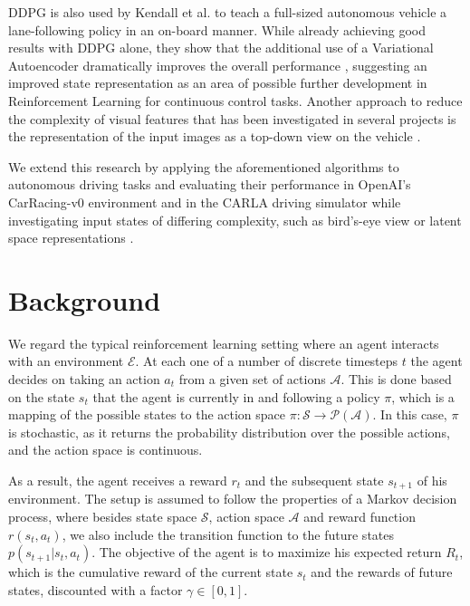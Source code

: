 \documentclass[letterpaper, 10 pt, conference]{ieeeconf}  %
\begin{document}
DDPG is also used by Kendall et al. to teach a full-sized autonomous vehicle a 
lane-following policy in an on-board manner. While already achieving good results 
with DDPG alone, they show that the additional use of a Variational Autoencoder dramatically 
improves the overall performance \cite{kendall2019learning}, suggesting an improved 
state representation as an area of possible further development in Reinforcement Learning 
for continuous control tasks. Another approach to reduce the complexity of visual 
features that has been investigated in several projects is the representation of the input 
images as a top-down view on the vehicle
 \cite{DBLP:journals/corr/abs-1812-03079}\cite{DBLP:journals/corr/abs-1903-00640}\cite{Djuric2018ShorttermMP}.

We extend this research by applying the aforementioned algorithms to autonomous driving tasks and evaluating their performance in OpenAI's CarRacing-v0 environment and in the CARLA driving simulator while investigating input states of differing complexity, such as bird's-eye view or latent space representations \cite{dosovitskiy2017carla}.


\section{Background}

We regard the typical reinforcement learning setting where an agent interacts with an environment $\mathcal{E}$. At each one of a number of discrete timesteps $t$ the agent decides on taking an action $a_t$ from a given set of actions $\mathcal{A}$. This is done based on the state $s_t$ that the agent is currently in and following a policy $\pi$, which is a mapping of the possible states to the action space $\pi: \mathcal{S} \rightarrow \mathcal{P}(\mathcal{A})$. In this case, $\pi$ is stochastic, as it returns the probability distribution over the possible actions, and the action space is continuous.

As a result, the agent receives a reward $r_t$ and the subsequent state $s_{t+1}$ of his environment. The setup is assumed to follow the properties of a Markov decision process, where besides state space $\mathcal{S}$, action space $\mathcal{A}$ and reward function $r(s_t,a_t)$, we also include the transition function to the future states $p(s_{t+1}|s_t,a_t)$. The objective of the agent is to maximize his expected return $R_t$, which is the cumulative reward of the current state $s_t$ and the rewards of future states, discounted with a factor $\gamma \in [0,1]$.
\end{document}
